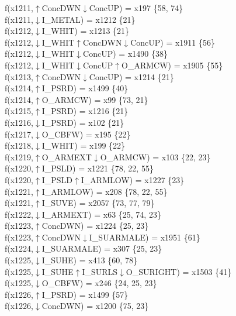 f(x1211,$\uparrow$ConcDWN$\downarrow$ConcUP) = x197 \{58, 74\} \\  
f(x1211,$\downarrow$I\_METAL) = x1212 \{21\} \\  
f(x1212,$\downarrow$I\_WHIT) = x1213 \{21\} \\  
f(x1212,$\downarrow$I\_WHIT$\uparrow$ConcDWN$\downarrow$ConcUP) = x1911 \{56\} \\  
f(x1212,$\downarrow$I\_WHIT$\downarrow$ConcUP) = x1490 \{38\} \\  
f(x1212,$\downarrow$I\_WHIT$\downarrow$ConcUP$\uparrow$O\_ARMCW) = x1905 \{55\} \\  
f(x1213,$\uparrow$ConcDWN$\downarrow$ConcUP) = x1214 \{21\} \\  
f(x1214,$\uparrow$I\_PSRD) = x1499 \{40\} \\  
f(x1214,$\uparrow$O\_ARMCW) = x99 \{73, 21\} \\  
f(x1215,$\uparrow$I\_PSRD) = x1216 \{21\} \\  
f(x1216,$\downarrow$I\_PSRD) = x102 \{21\} \\  
f(x1217,$\downarrow$O\_CBFW) = x195 \{22\} \\  
f(x1218,$\downarrow$I\_WHIT) = x199 \{22\} \\  
f(x1219,$\uparrow$O\_ARMEXT$\downarrow$O\_ARMCW) = x103 \{22, 23\} \\  
f(x1220,$\uparrow$I\_PSLD) = x1221 \{78, 22, 55\} \\  
f(x1220,$\uparrow$I\_PSLD$\uparrow$I\_ARMLOW) = x1227 \{23\} \\  
f(x1221,$\uparrow$I\_ARMLOW) = x208 \{78, 22, 55\} \\  
f(x1221,$\uparrow$I\_SUVE) = x2057 \{73, 77, 79\} \\  
f(x1222,$\downarrow$I\_ARMEXT) = x63 \{25, 74, 23\} \\  
f(x1223,$\uparrow$ConcDWN) = x1224 \{25, 23\} \\  
f(x1223,$\uparrow$ConcDWN$\downarrow$I\_SUARMALE) = x1951 \{61\} \\  
f(x1224,$\downarrow$I\_SUARMALE) = x307 \{25, 23\} \\  
f(x1225,$\downarrow$I\_SUHE) = x413 \{60, 78\} \\  
f(x1225,$\downarrow$I\_SUHE$\uparrow$I\_SURLS$\downarrow$O\_SURIGHT) = x1503 \{41\} \\  
f(x1225,$\downarrow$O\_CBFW) = x246 \{24, 25, 23\} \\  
f(x1226,$\uparrow$I\_PSRD) = x1499 \{57\} \\  
f(x1226,$\downarrow$ConcDWN) = x1200 \{75, 23\} \\  
